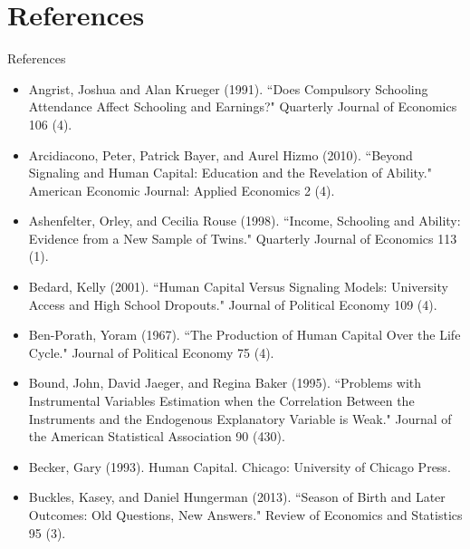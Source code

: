 \documentclass[blue]{beamer}
\begin{document}
{{{\section{References}
\begin{frame}{References}
\begin{scriptsize}
\begin{itemize}
\item Angrist, Joshua and Alan Krueger (1991). ``Does Compulsory Schooling Attendance Affect Schooling and Earnings?" Quarterly Journal of Economics 106 (4). 
\item Arcidiacono, Peter, Patrick Bayer, and Aurel Hizmo (2010). ``Beyond Signaling and Human Capital: Education and the Revelation of Ability." American Economic Journal: Applied Economics 2 (4).
\item Ashenfelter, Orley, and Cecilia Rouse (1998). ``Income, Schooling and Ability: Evidence from a New Sample of Twins." Quarterly Journal of Economics 113 (1). 
\item Bedard, Kelly (2001). ``Human Capital Versus Signaling Models: University Access and High School Dropouts." Journal of Political Economy 109 (4).
\item Ben-Porath, Yoram (1967). ``The Production of Human Capital Over the Life Cycle." Journal of Political Economy 75 (4). 
\item Bound, John, David Jaeger, and Regina Baker (1995). ``Problems with Instrumental Variables Estimation when the Correlation Between the Instruments and the Endogenous Explanatory Variable is Weak." Journal of the American Statistical Association 90 (430).
\item Becker, Gary (1993). Human Capital. Chicago: University of Chicago Press.
\item Buckles, Kasey, and Daniel Hungerman (2013). ``Season of Birth and Later Outcomes: Old Questions, New Answers." Review of Economics and Statistics 95 (3).
\end{itemize}
\end{scriptsize}
\end{frame}

}}}
\end{document}
